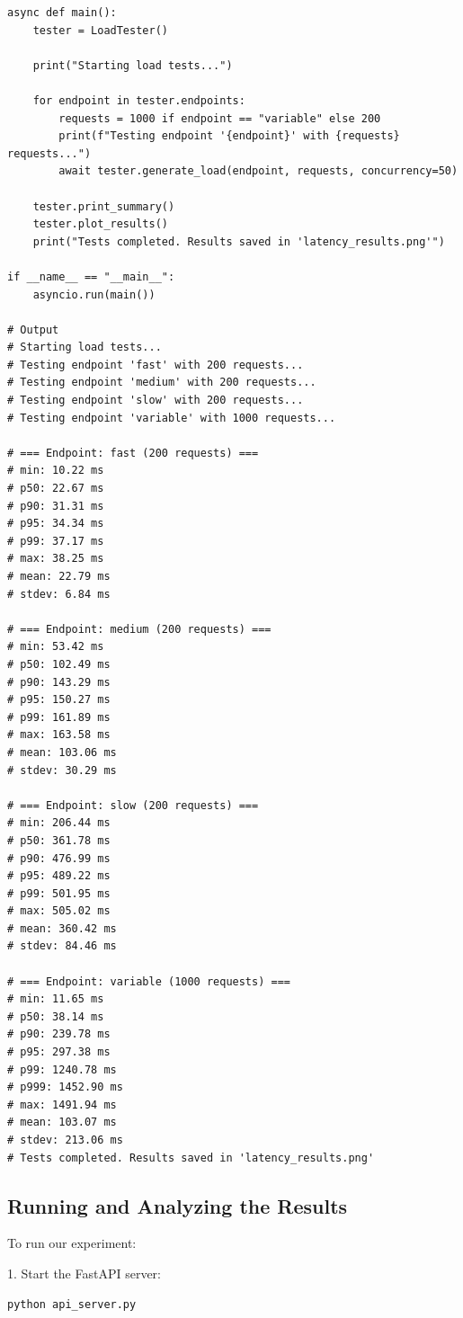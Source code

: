\documentclass[12pt,letterpaper]{article}
\newenvironment{macterminal}{%
    \begin{mdframed}[
        linecolor=terminalFrame,
        backgroundcolor=terminalBg,
        roundcorner=5pt,
        skipabove=10pt,
        skipbelow=10pt,
        linewidth=1pt,
        innertopmargin=10pt, %
        frametitle={%
            \tikz[baseline=(current bounding box.east), outer sep=0pt]{
                \fill[red!80!black] (0,0) circle (5pt);
                \fill[yellow!80!black] (0.7,0) circle (5pt);
                \fill[green!70!black] (1.4,0) circle (5pt);
            }
        },
        frametitlealignment=\raggedright, %
        frametitleaboveskip=8pt, %
        frametitlebelowskip=0pt, %
    ]
}{%
    \end{mdframed}%
}
\begin{document}
\begin{macterminal}
\begin{lstlisting}
async def main():
    tester = LoadTester()
    
    print("Starting load tests...")
    
    for endpoint in tester.endpoints:
        requests = 1000 if endpoint == "variable" else 200
        print(f"Testing endpoint '{endpoint}' with {requests} requests...")
        await tester.generate_load(endpoint, requests, concurrency=50)
    
    tester.print_summary()
    tester.plot_results()
    print("Tests completed. Results saved in 'latency_results.png'")

if __name__ == "__main__":
    asyncio.run(main())

# Output
# Starting load tests...
# Testing endpoint 'fast' with 200 requests...
# Testing endpoint 'medium' with 200 requests...
# Testing endpoint 'slow' with 200 requests...
# Testing endpoint 'variable' with 1000 requests...

# === Endpoint: fast (200 requests) ===
# min: 10.22 ms
# p50: 22.67 ms
# p90: 31.31 ms
# p95: 34.34 ms
# p99: 37.17 ms
# max: 38.25 ms
# mean: 22.79 ms
# stdev: 6.84 ms

# === Endpoint: medium (200 requests) ===
# min: 53.42 ms
# p50: 102.49 ms
# p90: 143.29 ms
# p95: 150.27 ms
# p99: 161.89 ms
# max: 163.58 ms
# mean: 103.06 ms
# stdev: 30.29 ms

# === Endpoint: slow (200 requests) ===
# min: 206.44 ms
# p50: 361.78 ms
# p90: 476.99 ms
# p95: 489.22 ms
# p99: 501.95 ms
# max: 505.02 ms
# mean: 360.42 ms
# stdev: 84.46 ms

# === Endpoint: variable (1000 requests) ===
# min: 11.65 ms
# p50: 38.14 ms
# p90: 239.78 ms
# p95: 297.38 ms
# p99: 1240.78 ms
# p999: 1452.90 ms
# max: 1491.94 ms
# mean: 103.07 ms
# stdev: 213.06 ms
# Tests completed. Results saved in 'latency_results.png'
\end{lstlisting}
\end{macterminal}

\subsection{Running and Analyzing the Results}

To run our experiment:

1. Start the FastAPI server:
\begin{macterminal}
\begin{lstlisting}
python api_server.py
\end{lstlisting}
\end{macterminal}
\end{document}
